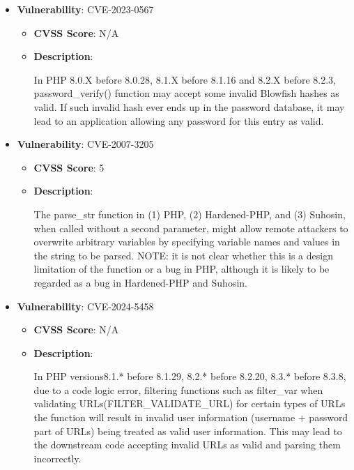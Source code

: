\documentclass{article}
\begin{document}
\begin{itemize}
        \item \textbf{Vulnerability}: CVE-2023-0567
        \begin{itemize}
            \item \textbf{CVSS Score}:  N/A 
            \item \textbf{Description}:
            \parbox[t]{0.9\linewidth}{
                \ttfamily In PHP 8.0.X before 8.0.28, 8.1.X before 8.1.16 and 8.2.X before 8.2.3, password\_verify() function may accept some invalid Blowfish hashes as valid. If such invalid hash ever ends up in the password database, it may lead to an application allowing any password for this entry as valid.
            }
        \end{itemize}
    
        \item \textbf{Vulnerability}: CVE-2007-3205
        \begin{itemize}
            \item \textbf{CVSS Score}:  5 
            \item \textbf{Description}:
            \parbox[t]{0.9\linewidth}{
                \ttfamily The parse\_str function in (1) PHP, (2) Hardened-PHP, and (3) Suhosin, when called without a second parameter, might allow remote attackers to overwrite arbitrary variables by specifying variable names and values in the string to be parsed.  NOTE: it is not clear whether this is a design limitation of the function or a bug in PHP, although it is likely to be regarded as a bug in Hardened-PHP and Suhosin.
            }
        \end{itemize}
    
        \item \textbf{Vulnerability}: CVE-2024-5458
        \begin{itemize}
            \item \textbf{CVSS Score}:  N/A 
            \item \textbf{Description}:
            \parbox[t]{0.9\linewidth}{
                \ttfamily In PHP versions8.1.* before 8.1.29, 8.2.* before 8.2.20, 8.3.* before 8.3.8, due to a code logic error, filtering functions such as filter\_var when validating URLs(FILTER\_VALIDATE\_URL) for certain types of URLs the function will result in invalid user information (username + password part of URLs) being treated as valid user information. This may lead to the downstream code accepting invalid URLs as valid and parsing them incorrectly.
            }
        \end{itemize}
    

\end{itemize}
\end{document}
